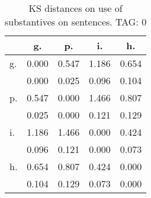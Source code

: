 \begin{table}[h!]
\begin{center}
\begin{tabular}{| l | c | c | c | c |}\hline
 & g. & p. & i. & h. \\\hline
g. & 0.000  & 0.547  & 1.186  & 0.654 \\\hline
 & 0.000  & 0.025  & 0.096  & 0.104 \\\hline
p. & 0.547  & 0.000  & 1.466  & 0.807 \\\hline
 & 0.025  & 0.000  & 0.121  & 0.129 \\\hline
i. & 1.186  & 1.466  & 0.000  & 0.424 \\\hline
 & 0.096  & 0.121  & 0.000  & 0.073 \\\hline
h. & 0.654  & 0.807  & 0.424  & 0.000 \\\hline
 & 0.104  & 0.129  & 0.073  & 0.000 \\\hline
\end{tabular}
\caption{KS distances on use of substantives on sentences. TAG: 0}
\end{center}
\end{table}